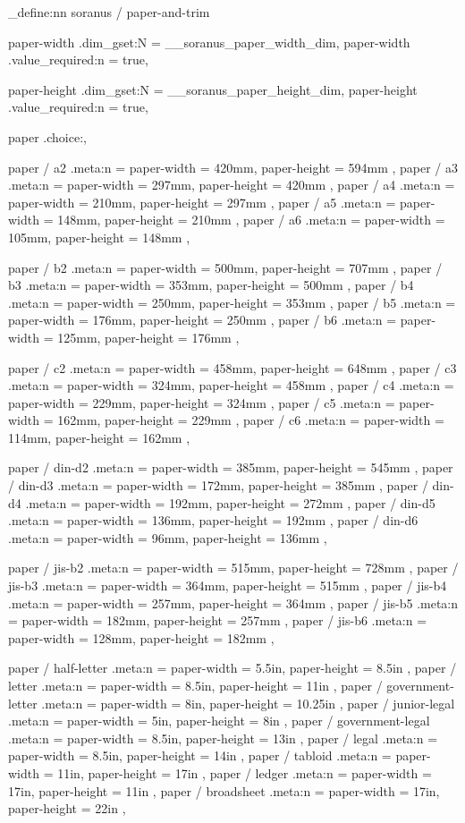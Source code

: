 \keys_define:nn { soranus / paper-and-trim } 
  {
    paper-width .dim_gset:N       = \g__soranus_paper_width_dim,
    paper-width .value_required:n = true,

    paper-height .dim_gset:N       = \g__soranus_paper_height_dim,
    paper-height .value_required:n = true,


    paper .choice:,

    paper / a2 .meta:n = { paper-width = 420mm, paper-height = 594mm },
    paper / a3 .meta:n = { paper-width = 297mm, paper-height = 420mm },
    paper / a4 .meta:n = { paper-width = 210mm, paper-height = 297mm },
    paper / a5 .meta:n = { paper-width = 148mm, paper-height = 210mm },
    paper / a6 .meta:n = { paper-width = 105mm, paper-height = 148mm },

    paper / b2 .meta:n = { paper-width = 500mm, paper-height = 707mm },
    paper / b3 .meta:n = { paper-width = 353mm, paper-height = 500mm },
    paper / b4 .meta:n = { paper-width = 250mm, paper-height = 353mm },
    paper / b5 .meta:n = { paper-width = 176mm, paper-height = 250mm },
    paper / b6 .meta:n = { paper-width = 125mm, paper-height = 176mm },

    paper / c2 .meta:n = { paper-width = 458mm, paper-height = 648mm },
    paper / c3 .meta:n = { paper-width = 324mm, paper-height = 458mm },
    paper / c4 .meta:n = { paper-width = 229mm, paper-height = 324mm },
    paper / c5 .meta:n = { paper-width = 162mm, paper-height = 229mm },
    paper / c6 .meta:n = { paper-width = 114mm, paper-height = 162mm },

    paper / din-d2 .meta:n = { paper-width = 385mm, paper-height = 545mm },
    paper / din-d3 .meta:n = { paper-width = 172mm, paper-height = 385mm },
    paper / din-d4 .meta:n = { paper-width = 192mm, paper-height = 272mm },
    paper / din-d5 .meta:n = { paper-width = 136mm, paper-height = 192mm },
    paper / din-d6 .meta:n = { paper-width = 96mm, paper-height = 136mm },

    paper / jis-b2 .meta:n = { paper-width = 515mm, paper-height = 728mm },
    paper / jis-b3 .meta:n = { paper-width = 364mm, paper-height = 515mm },
    paper / jis-b4 .meta:n = { paper-width = 257mm, paper-height = 364mm },
    paper / jis-b5 .meta:n = { paper-width = 182mm, paper-height = 257mm },
    paper / jis-b6 .meta:n = { paper-width = 128mm, paper-height = 182mm },

    paper / half-letter       .meta:n = { paper-width = 5.5in, paper-height = 8.5in },
    paper / letter            .meta:n = { paper-width = 8.5in, paper-height = 11in },
    paper / government-letter .meta:n = { paper-width = 8in, paper-height = 10.25in },
    paper / junior-legal      .meta:n = { paper-width = 5in, paper-height = 8in },
    paper / government-legal  .meta:n = { paper-width = 8.5in, paper-height = 13in },
    paper / legal             .meta:n = { paper-width = 8.5in, paper-height = 14in },
    paper / tabloid           .meta:n = { paper-width = 11in, paper-height = 17in },
    paper / ledger            .meta:n = { paper-width = 17in, paper-height = 11in },
    paper / broadsheet        .meta:n = { paper-width = 17in, paper-height = 22in },

}
